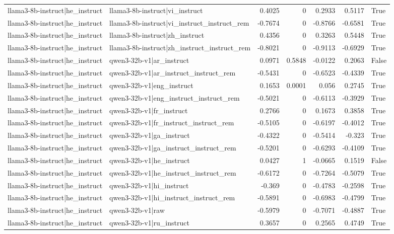 \begin{table}
\begin{tabular}{l l r r r r l}
llama3-8b-instruct|he_instruct & llama3-8b-instruct|vi_instruct & 0.4025 & 0 & 0.2933 & 0.5117 & True \\
llama3-8b-instruct|he_instruct & llama3-8b-instruct|vi_instruct_instruct_rem & -0.7674 & 0 & -0.8766 & -0.6581 & True \\
llama3-8b-instruct|he_instruct & llama3-8b-instruct|zh_instruct & 0.4356 & 0 & 0.3263 & 0.5448 & True \\
llama3-8b-instruct|he_instruct & llama3-8b-instruct|zh_instruct_instruct_rem & -0.8021 & 0 & -0.9113 & -0.6929 & True \\
llama3-8b-instruct|he_instruct & qwen3-32b-v1|ar_instruct & 0.0971 & 0.5848 & -0.0122 & 0.2063 & False \\
llama3-8b-instruct|he_instruct & qwen3-32b-v1|ar_instruct_instruct_rem & -0.5431 & 0 & -0.6523 & -0.4339 & True \\
llama3-8b-instruct|he_instruct & qwen3-32b-v1|eng_instruct & 0.1653 & 0.0001 & 0.056 & 0.2745 & True \\
llama3-8b-instruct|he_instruct & qwen3-32b-v1|eng_instruct_instruct_rem & -0.5021 & 0 & -0.6113 & -0.3929 & True \\
llama3-8b-instruct|he_instruct & qwen3-32b-v1|fr_instruct & 0.2766 & 0 & 0.1673 & 0.3858 & True \\
llama3-8b-instruct|he_instruct & qwen3-32b-v1|fr_instruct_instruct_rem & -0.5105 & 0 & -0.6197 & -0.4012 & True \\
llama3-8b-instruct|he_instruct & qwen3-32b-v1|ga_instruct & -0.4322 & 0 & -0.5414 & -0.323 & True \\
llama3-8b-instruct|he_instruct & qwen3-32b-v1|ga_instruct_instruct_rem & -0.5201 & 0 & -0.6293 & -0.4109 & True \\
llama3-8b-instruct|he_instruct & qwen3-32b-v1|he_instruct & 0.0427 & 1 & -0.0665 & 0.1519 & False \\
llama3-8b-instruct|he_instruct & qwen3-32b-v1|he_instruct_instruct_rem & -0.6172 & 0 & -0.7264 & -0.5079 & True \\
llama3-8b-instruct|he_instruct & qwen3-32b-v1|hi_instruct & -0.369 & 0 & -0.4783 & -0.2598 & True \\
llama3-8b-instruct|he_instruct & qwen3-32b-v1|hi_instruct_instruct_rem & -0.5891 & 0 & -0.6983 & -0.4799 & True \\
llama3-8b-instruct|he_instruct & qwen3-32b-v1|raw & -0.5979 & 0 & -0.7071 & -0.4887 & True \\
llama3-8b-instruct|he_instruct & qwen3-32b-v1|ru_instruct & 0.3657 & 0 & 0.2565 & 0.4749 & True \\

\end{tabular}
\end{table}
